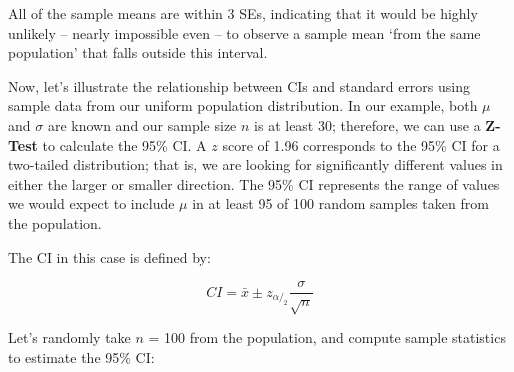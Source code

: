 \documentclass[]{book}
\newenvironment{Shaded}{\begin{snugshade}}{\end{snugshade}}
\newcommand{\CommentTok}[1]{\textcolor[rgb]{0.56,0.35,0.01}{\textit{#1}}}
\newcommand{\DataTypeTok}[1]{\textcolor[rgb]{0.13,0.29,0.53}{#1}}
\newcommand{\DecValTok}[1]{\textcolor[rgb]{0.00,0.00,0.81}{#1}}
\newcommand{\FloatTok}[1]{\textcolor[rgb]{0.00,0.00,0.81}{#1}}
\newcommand{\KeywordTok}[1]{\textcolor[rgb]{0.13,0.29,0.53}{\textbf{#1}}}
\newcommand{\NormalTok}[1]{#1}
\newcommand{\OperatorTok}[1]{\textcolor[rgb]{0.81,0.36,0.00}{\textbf{#1}}}
\newcommand{\OtherTok}[1]{\textcolor[rgb]{0.56,0.35,0.01}{#1}}
\newcommand{\StringTok}[1]{\textcolor[rgb]{0.31,0.60,0.02}{#1}}
\begin{document}
All of the sample means are within 3 SEs, indicating that it would be highly unlikely -- nearly impossible even -- to observe a sample mean `from the same population' that falls outside this interval.

Now, let's illustrate the relationship between CIs and standard errors using sample data from our uniform population distribution. In our example, both \(\mu\) and \(\sigma\) are known and our sample size \(n\) is at least 30; therefore, we can use a \textbf{Z-Test} to calculate the 95\% CI. A \(z\) score of 1.96 corresponds to the 95\% CI for a two-tailed distribution; that is, we are looking for significantly different values in either the larger or smaller direction. The 95\% CI represents the range of values we would expect to include \(\mu\) in at least 95 of 100 random samples taken from the population.

The CI in this case is defined by:

\[ CI = \bar{x} \pm z_{\alpha/_2} \frac{\sigma}{\sqrt{n}} \]

Let's randomly take \(n\) = 100 from the population, and compute sample statistics to estimate the 95\% CI:

\begin{Shaded}
\end{Shaded}

\begin{Shaded}
\end{Shaded}
\end{document}
